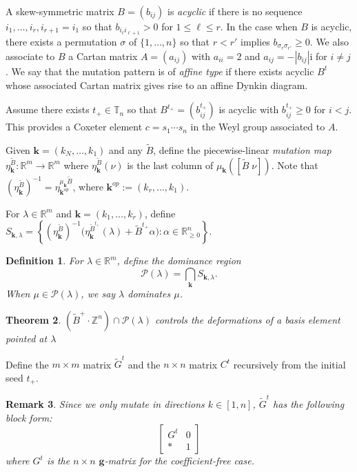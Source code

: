 \documentclass{amsart}
\newtheorem{theorem}{Theorem}
\newtheorem{definition}[theorem]{Definition}
\newtheorem{remark}[theorem]{Remark}
\numberwithin{theorem}{section}
\newcommand{\bfg}{\boldsymbol{g}}
\newcommand{\bfk}{{\boldsymbol{k}}}
\newcommand{\cP}{\mathcal{P}}
\newcommand{\RR}{\mathbb{R}}
\newcommand{\TT}{\mathbb{T}}
\newcommand{\ZZ}{\mathbb{Z}}
\begin{document}
  A skew-symmetric matrix $B=(b_{ij})$ is \emph{acyclic} if there is no sequence $i_1,\ldots,i_r,i_{r+1}=i_1$ so that $b_{i_\ell i_{\ell+1}}>0$ for $1\le\ell\le r$.
  In the case when $B$ is acyclic, there exists a permutation $\sigma$ of $\{1,\ldots,n\}$ so that $r<r'$ implies $b_{\sigma_r \sigma_{r'}}\ge 0$.
  We also associate to $B$ a Cartan matrix $A=(a_{ij})$ with $a_{ii}=2$ and $a_{ij}=-|b_{ij}|$i for $i\ne j$.
  We say that the mutation pattern is of \emph{affine type} if there exists acyclic $B^t$ whose associated Cartan matrix gives rise to an affine Dynkin diagram.
  
  Assume there exists $t_+\in\TT_n$ so that $B^{t_+}=(b^{t_+}_{ij})$ is acyclic with $b^{t_+}_{ij}\ge 0$ for $i<j$.
  This provides a Coxeter element $c=s_1\cdots s_n$ in the Weyl group associated to $A$.
  
  Given $\bfk=(k_N,\ldots,k_1)$ and any $\tilde B$, define the piecewise-linear \emph{mutation map} $\eta^{\tilde B}_\bfk:\RR^m\to\RR^m$ where $\eta^{\tilde B}_\bfk(\nu)$ is the last column of $\mu_\bfk([\tilde{B}\;\nu])$.
  Note that $\left(\eta^{\tilde{B}}_\bfk\right)^{-1}=\eta^{\mu_\bfk\tilde{B}}_{\bfk^{op}}$, where $\bfk^{op}:=(k_r,\ldots,k_1)$.

  For $\lambda\in\RR^m$ and $\bfk=(k_1,\ldots,k_r)$, define $S_{\bfk,\lambda}=\left\{\left(\eta^{\tilde{B}}_\bfk\right)^{-1}\big(\eta^{\tilde B^{t_+}}_\bfk(\lambda)+\tilde{B}^{t_+}\alpha\big):\alpha\in\RR^n_{\ge0}\right\}$.
  
  \begin{definition}
    For $\lambda\in\RR^m$, define the \emph{dominance region} 
    \[
      \cP(\lambda) = \bigcap_\bfk S_{\bfk,\lambda}.
    \]
    When $\mu\in\cP(\lambda)$, we say \emph{$\lambda$ dominates $\mu$}.
  \end{definition}

  \begin{theorem}
    \cite{qin}
    $(\tilde B^+\cdot\ZZ^n)\cap \cP(\lambda)$ controls the deformations of a basis element pointed at $\lambda$
  \end{theorem}

  Define the $m\times m$ matrix $\tilde G^t$ and the $n\times n$ matrix $C^t$ recursively from the initial seed $t_+$.
  \begin{remark}
    Since we only mutate in directions $k\in[1,n]$, $\tilde G^t$ has the following block form:
    \[\left[\begin{array}{cc} G^t & 0\\ * & 1\end{array}\right]\]
    where $G^t$ is the $n\times n$ $\bfg$-matrix for the coefficient-free case.
  \end{remark}
\end{document}
